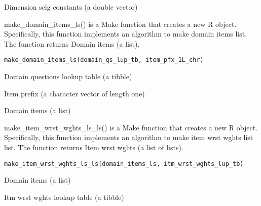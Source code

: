 \documentclass[a4paper]{book}
\begin{document}
%
\begin{Value}
Dimension sclg constants (a double vector)
\end{Value}
%
\begin{Description}\relax
make\_domain\_items\_ls() is a Make function that creates a new R object. Specifically, this function implements an algorithm to make domain items list. The function returns Domain items (a list).
\end{Description}
%
\begin{Usage}
\begin{verbatim}
make_domain_items_ls(domain_qs_lup_tb, item_pfx_1L_chr)
\end{verbatim}
\end{Usage}
%
\begin{Arguments}
\begin{ldescription}
\item[\code{domain\_qs\_lup\_tb}] Domain questions lookup table (a tibble)

\item[\code{item\_pfx\_1L\_chr}] Item prefix (a character vector of length one)
\end{ldescription}
\end{Arguments}
%
\begin{Value}
Domain items (a list)
\end{Value}
%
\begin{Description}\relax
make\_item\_wrst\_wghts\_ls\_ls() is a Make function that creates a new R object. Specifically, this function implements an algorithm to make item wrst wghts list list. The function returns Item wrst wghts (a list of lists).
\end{Description}
%
\begin{Usage}
\begin{verbatim}
make_item_wrst_wghts_ls_ls(domain_items_ls, itm_wrst_wghts_lup_tb)
\end{verbatim}
\end{Usage}
%
\begin{Arguments}
\begin{ldescription}
\item[\code{domain\_items\_ls}] Domain items (a list)

\item[\code{itm\_wrst\_wghts\_lup\_tb}] Itm wrst wghts lookup table (a tibble)
\end{ldescription}
\end{Arguments}
\end{document}
